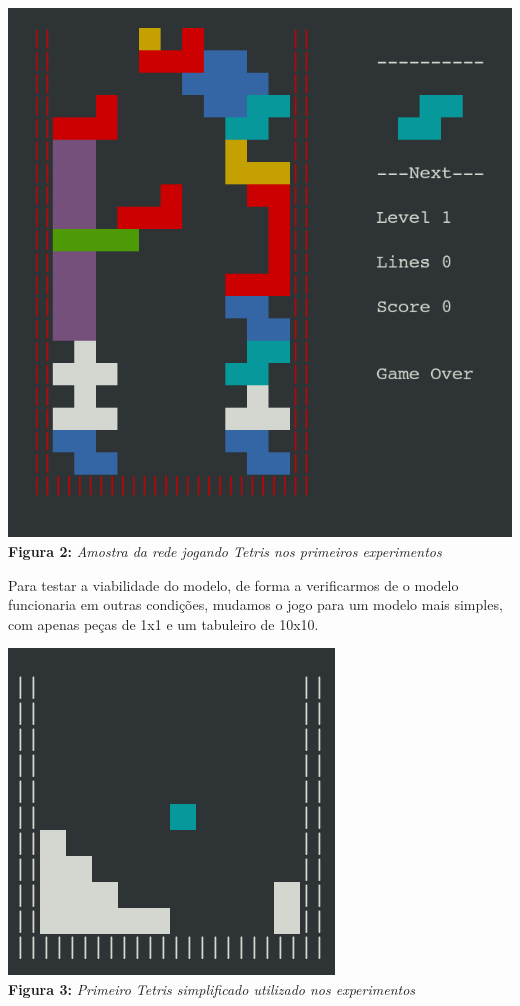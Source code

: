 \documentclass[conference]{IEEEtran}
\begin{document}
\begin{center}
\includegraphics[scale=0.2]{tetris_lose.png}\\

\textbf{Figura 2:} \textit{Amostra da rede jogando Tetris nos primeiros experimentos}
\end{center}

Para testar a viabilidade do modelo, de forma a verificarmos de o modelo funcionaria em outras condições, mudamos o jogo para um modelo mais simples, com apenas peças de 1x1 e um tabuleiro de 10x10.

\begin{center}
\includegraphics[scale=0.3]{tetris_simples.png}\\

\textbf{Figura 3:} \textit{Primeiro Tetris simplificado utilizado nos experimentos}
\end{center}
\end{document}
